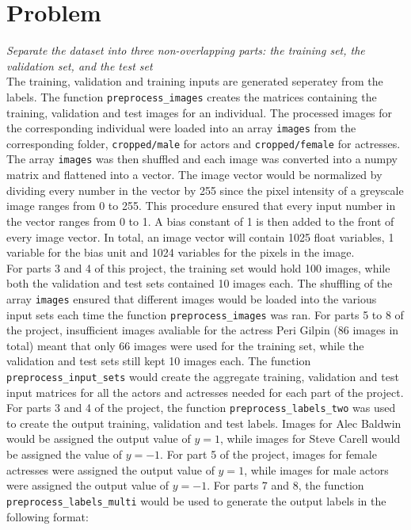 \documentclass{article}
\newcommand{\enterProblemHeader}[1]{
}
\newcommand{\exitProblemHeader}[1]{
}
\newcounter{homeworkProblemCounter} %
\newcommand{\homeworkProblemName}{}
\newenvironment{homeworkProblem}[1][Problem \arabic{homeworkProblemCounter}]{ %
\stepcounter{homeworkProblemCounter} %
\renewcommand{\homeworkProblemName}{#1} %
\section{\homeworkProblemName} %
\enterProblemHeader{\homeworkProblemName} %
}{
\exitProblemHeader{\homeworkProblemName} %
}
\begin{document}

\begin{homeworkProblem}

\noindent \textit{Separate the dataset into three non-overlapping parts: the training set, the validation set, and the test set}\\

The training, validation and training inputs are generated seperatey from the labels. The function \texttt{preprocess\_images} creates the matrices containing the training, validation and test images for an individual. The processed images for the corresponding individual were loaded into an array \texttt{images} from the corresponding folder, \texttt{cropped/male} for actors and \texttt{cropped/female} for actresses. The array \texttt{images} was then shuffled and each image was converted into a numpy matrix and flattened into a vector. The image vector would be normalized by dividing every number in the vector by 255 since the pixel intensity of a greyscale image ranges from 0 to 255. This procedure ensured that every input number in the vector ranges from 0 to 1. A bias constant of 1 is then added to the front of every image vector. In total, an image vector will contain 1025 float variables, 1 variable for the bias unit and 1024 variables for the pixels in the image.\\

For parts 3 and 4 of this project, the training set would hold 100 images, while both the validation and test sets contained 10 images each. The shuffling of the array \texttt{images} ensured that different images would be loaded into the various input sets each time the function \texttt{preprocess\_images} was ran. For parts 5 to 8 of the project, insufficient images avaliable for the actress Peri Gilpin (86 images in total) meant that only 66 images were used for the training set, while the validation and test sets still kept 10 images each. The function \texttt{preprocess\_input\_sets} would create the aggregate training, validation and test input matrices for all the actors and actresses needed for each part of the project.\\

For parts 3 and 4 of the project, the function \texttt{preprocess\_labels\_two} was used to create the output training, validation and test labels. Images for Alec Baldwin would be assigned the output value of $y=1$, while images for Steve Carell would be assigned the value of $y=-1$. For part 5 of the project, images for female actresses were assigned the output value of $y=1$, while images for male actors were assigned the output value of $y=-1$. For parts 7 and 8, the function \texttt{preprocess\_labels\_multi} would be used to generate the output labels in the following format:\\


\end{homeworkProblem}
\end{document}
